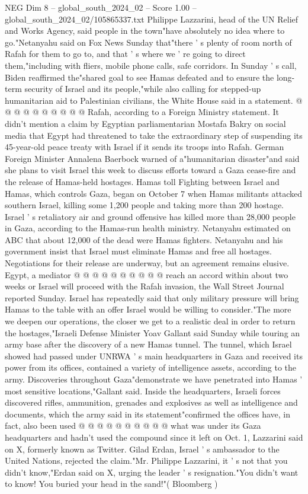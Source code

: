 \begin{textsample}{NEG Dim 8 – global\_south\_2024\_02 – Score 1.00 – global\_south\_2024\_02/105865337.txt}
Philippe Lazzarini, head of the UN Relief and Works Agency, said people in the town"have absolutely no idea where to go."Netanyahu said on Fox News Sunday that"there ' s plenty of room north of Rafah for them to go to, and that ' s where we ' re going to direct them,"including with fliers, mobile phone calls, safe corridors.
In Sunday ' s call, Biden reaffirmed the"shared goal to see Hamas defeated and to ensure the long-term security of Israel and its people,"while also calling for stepped-up humanitarian aid to Palestinian civilians, the White House said in a statement. @ @ @ @ @ @ @ @ @ @ Rafah, according to a Foreign Ministry statement.
It didn't mention a claim by Egyptian parliamentarian Mostafa Bakry on social media that Egypt had threatened to take the extraordinary step of suspending its 45-year-old peace treaty with Israel if it sends its troops into Rafah.
German Foreign Minister Annalena Baerbock warned of a"humanitarian disaster"and said she plans to visit Israel this week to discuss efforts toward a Gaza cease-fire and the release of Hamas-held hostages.
Hamas toll Fighting between Israel and Hamas, which controls Gaza, began on October 7 when Hamas militants attacked southern Israel, killing some 1,200 people and taking more than 200 hostage.
Israel ' s retaliatory air and ground offensive has killed more than 28,000 people in Gaza, according to the Hamas-run health ministry.
Netanyahu estimated on ABC that about 12,000 of the dead were Hamas fighters.
Netanyahu and his government insist that Israel must eliminate Hamas and free all hostages.
Negotiations for their release are underway, but an agreement remains elusive.
Egypt, a mediator @ @ @ @ @ @ @ @ @ @ reach an accord within about two weeks or Israel will proceed with the Rafah invasion, the Wall Street Journal reported Sunday.
Israel has repeatedly said that only military pressure will bring Hamas to the table with an offer Israel would be willing to consider."The more we deepen our operations, the closer we get to a realistic deal in order to return the hostages,"Israeli Defense Minister Yoav Gallant said Sunday while touring an army base after the discovery of a new Hamas tunnel.
The tunnel, which Israel showed had passed under UNRWA ' s main headquarters in Gaza and received its power from its offices, contained a variety of intelligence assets, according to the army.
Discoveries throughout Gaza"demonstrate we have penetrated into Hamas ' most sensitive locations,"Gallant said.
Inside the headquarters, Israeli forces discovered rifles, ammunition, grenades and explosives as well as intelligence and documents, which the army said in its statement"confirmed the offices have, in fact, also been used @ @ @ @ @ @ @ @ @ @ what was under its Gaza headquarters and hadn't used the compound since it left on Oct. 1, Lazzarini said on X, formerly known as Twitter.
Gilad Erdan, Israel ' s ambassador to the United Nations, rejected the claim."Mr.
Philippe Lazzarini, it ' s not that you didn't know,"Erdan said on X, urging the leader ' s resignation."You didn't want to know!
You buried your head in the sand!"( Bloomberg )

\end{textsample}
